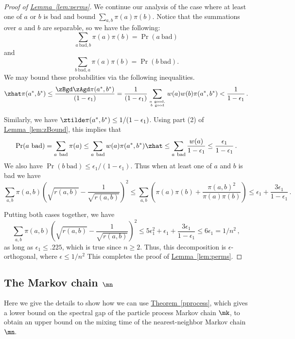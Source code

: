 \documentclass[11pt]{article}
\providecommand{\expref}[2]{\texorpdfstring{\hyperref[#2]{#1~\ref{#2}}}{#1~\ref{#2}}}
\begin{document}
\begin{proof}[Proof of \expref{Lemma}{lem:perms}]
We continue our analysis of the case where at least one of $a$ or $b$ is bad and bound $\sum_{a,b}\pi(a)\pi(b).$ 
Notice that the summations over $a$ and $b$ are separable, so we have 
the following:
\begin{equation*}
  \sum_{a~\text{bad}, b} \pi(a)\pi(b) = \Pr(a~\text{bad})
\end{equation*}
and
\begin{equation*}
  \sum_{b~\text{bad}, a} \pi(a)\pi(b) = \Pr(b~\text{bad}).
\end{equation*}
We may bound these probabilities via the following inequalities.
 $$\zhat\pi(a^*,b^*) \leq
  \frac{\zBgd\zAgd\pi(a^*,b^*)}{(1-\epsilon_1)}=\frac{1}{(1-\epsilon_1)}\sum_{a~\text{good},\atop
    b~\text{good}} w(a)w(b) \pi(a^*,b^*)  <
  \frac{1}{1-\epsilon_1}\,.$$
  
\noindent Similarly, we have $\ztilde\pi(a^*,b^*)\leq 
1/(1-\epsilon_1)$.  Using part (2) of \expref{Lemma}{lem:zBound}, this 
implies that
  \[\Pr(a~\text{bad}) = \sum_{a~\text{bad}}\pi(a) \leq
  \sum_{a~\text{bad}}w(a)\pi(a^*,b^*)\zhat\leq
  \sum_{a~\text{bad}}\frac{w(a)}{1-\epsilon_1}\leq
  \frac{\epsilon_1}{1-\epsilon_1} \,.\]
  We also have $\Pr(b~\text{bad}) \leq \epsilon_1/(1-\epsilon_1)$.
Thus when at least one of $a$ and $b$ is bad we have $$\sum_{a,b}\pi(a,b)\left(\sqrt{r(a,b)}-\frac{1}{\sqrt{r(a,b)}}\right)^2\leq
\sum_{a,b} \left(\pi(a)\pi(b) + \frac{\pi(a,b)^2}{\pi(a)\pi(b)}\right) \leq \epsilon_1 + \frac{3\epsilon_1}{1-\epsilon_1}\,.$$

Putting both cases together, we have
 \[\sum_{a, b}\pi(a,b)\left(\sqrt{r(a,b)}-\frac{1}{\sqrt{r(a,b)}}\right)^2\leq
  5\epsilon_1^2 + \epsilon_1 + \frac{3\epsilon_1}{1-\epsilon_1} \leq
  6\epsilon_1 = 1/n^2\,,\]
  as long as $\epsilon_1\leq .225$, which is true since $n\geq 2$.
Thus, this decomposition is %
$\epsilon$-orthogonal, where $\epsilon\leq 1/n^2$ %
This completes the proof of \expref{Lemma}{lem:perms}. %
%
%
%
\end{proof}   %

\subsection{The Markov chain $\mn$}\label{sec:mn}

Here we give the details to show how we can use \expref{Theorem}{pprocess}, 
which gives a  %
lower  %
bound on the spectral gap of the particle process Markov 
chain $\mk$, to obtain %
an upper  %
bound on the mixing time of the 
nearest-neighbor Markov chain $\mn.$  
\end{document}
